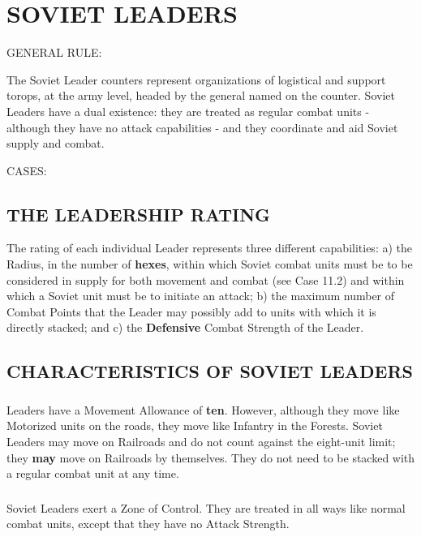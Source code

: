 \section{SOVIET LEADERS}

GENERAL RULE:

The Soviet Leader counters represent organizations of logistical and support torops, at the army level, headed by the general named on the counter. Soviet Leaders have a dual existence: they are treated as regular combat units - although they have no attack capabilities - and they coordinate and aid Soviet supply and combat.

CASES:

\subsection{THE LEADERSHIP RATING}

The rating of each individual Leader represents three different capabilities: a) the Radius, in the number of \textbf{hexes}, within which Soviet combat units must be to be considered in supply for both movement and combat (see Case 11.2) and within which a Soviet unit must be to initiate an attack; b) the maximum number of Combat Points that the Leader may possibly add to units with which it is directly stacked; and c) the \textbf{Defensive} Combat Strength of the Leader.

\subsection{CHARACTERISTICS OF SOVIET LEADERS}

\subsubsection{} Leaders have a Movement Allowance of \textbf{ten}. However, although they move like Motorized units on the roads, they move like Infantry in the Forests. Soviet Leaders may move on Railroads and do not count against the eight-unit limit; they \textbf{may} move on Railroads by themselves. They do not need to be stacked with a regular combat unit at any time.

\subsubsection{} Soviet Leaders exert a Zone of Control. They are treated in all ways like normal combat units, except that they have no Attack Strength.

